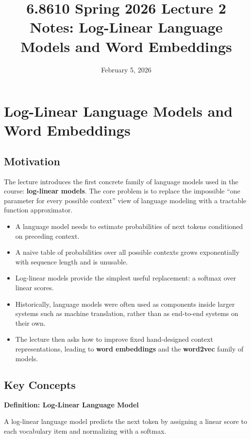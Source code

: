 \documentclass[11pt]{article}
\title{6.8610 Spring 2026 Lecture 2 Notes: Log-Linear Language Models and Word Embeddings}
\author{}
\date{February 5, 2026}
\begin{document}
\maketitle

\section{Log-Linear Language Models and Word Embeddings}

\subsection{Motivation}
The lecture introduces the first concrete family of language models used in the course: \textbf{log-linear models}. The core problem is to replace the impossible ``one parameter for every possible context'' view of language modeling with a tractable function approximator.

\begin{itemize}
    \item A language model needs to estimate probabilities of next tokens conditioned on preceding context.
    \item A naive table of probabilities over all possible contexts grows exponentially with sequence length and is unusable.
    \item Log-linear models provide the simplest useful replacement: a softmax over linear scores.
    \item Historically, language models were often used as components inside larger systems such as machine translation, rather than as end-to-end systems on their own.
    \item The lecture then asks how to improve fixed hand-designed context representations, leading to \textbf{word embeddings} and the \textbf{word2vec} family of models.
\end{itemize}

\subsection{Key Concepts}
\textbf{Definition: Log-Linear Language Model}

A log-linear language model predicts the next token by assigning a linear score to each vocabulary item and normalizing with a softmax.
\end{document}
